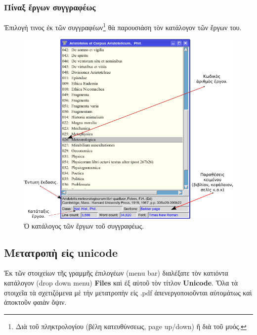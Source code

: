 \documentclass[12pt,a4paper]{article}
\begin{document}
  \subsubsection*{Πίναξ ἔργων συγγραφέως} Ἐπιλογή τινος ἐκ τῶν
    συγγραφέων\footnote{Διὰ τοῦ πληκτρολογίου (βέλη κατευθύνσεως, page up/down)
    ἢ διὰ τοῦ μυός.} θὰ παρουσιάση τὸν κατάλογον τῶν ἔργων του.
          \begin{figure}[htb]
            \begin{center}
              \includegraphics[scale=0.6]{../images/works-gr.png}
              \caption{Ὁ κατάλογος τῶν ἔργων τοῦ συγγραφέως.}
            \end{center}
          \end{figure}
  \subsection{Μετατροπὴ εἰς unicode}
    Ἐκ τῶν στοιχείων τῆς γραμμῆς ἐπιλογέων (menu bar) διαλέξατε τὸν κατιόντα
    κατάλογον (drop down menu) {\bf Files} καὶ ἐξ αὐτοῦ τὸν
    τίτλον {\bf Unicode}.
    Ὅλα τὰ στοιχεῖα τὰ σχετιζόμενα μὲ τὴν μετατροπὴν εἰς .pdf
    ἀπενεργοποιοῦνται αὐτομάτως καὶ ἀποκτοῦν φαιὰν ὄψιν.
\end{document}
